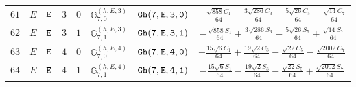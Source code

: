 \documentclass[fleqn,8pt]{jsarticle}
\begin{document}
\begin{table}[ht!]
\begin{center}
\begin{tabular}{cccccccc}
$ 61 $ & $ E $ & $ {\tt E} $ & $ 3 $ & $ 0 $ & $ \mathbb{G}_{7,0}^{(h,E,3)} $ & $ {\tt Gh(7,E,3,0)} $ & $ - \frac{\sqrt{858} C_{1}}{64} - \frac{3 \sqrt{286} C_{3}}{64} - \frac{5 \sqrt{26} C_{5}}{64} - \frac{\sqrt{14} C_{7}}{64} $ \\
$ 62 $ & $ E $ & $ {\tt E} $ & $ 3 $ & $ 1 $ & $ \mathbb{G}_{7,1}^{(h,E,3)} $ & $ {\tt Gh(7,E,3,1)} $ & $ - \frac{\sqrt{858} S_{1}}{64} + \frac{3 \sqrt{286} S_{3}}{64} - \frac{5 \sqrt{26} S_{5}}{64} + \frac{\sqrt{14} S_{7}}{64} $ \\
$ 63 $ & $ E $ & $ {\tt E} $ & $ 4 $ & $ 0 $ & $ \mathbb{G}_{7,0}^{(h,E,4)} $ & $ {\tt Gh(7,E,4,0)} $ & $ - \frac{15 \sqrt{6} C_{1}}{64} + \frac{19 \sqrt{2} C_{3}}{64} - \frac{\sqrt{22} C_{5}}{64} - \frac{\sqrt{2002} C_{7}}{64} $ \\
$ 64 $ & $ E $ & $ {\tt E} $ & $ 4 $ & $ 1 $ & $ \mathbb{G}_{7,1}^{(h,E,4)} $ & $ {\tt Gh(7,E,4,1)} $ & $ - \frac{15 \sqrt{6} S_{1}}{64} - \frac{19 \sqrt{2} S_{3}}{64} - \frac{\sqrt{22} S_{5}}{64} + \frac{\sqrt{2002} S_{7}}{64} $ \\
 \hline \hline
\end{tabular}
\end{center}
\end{table}
\end{document}
